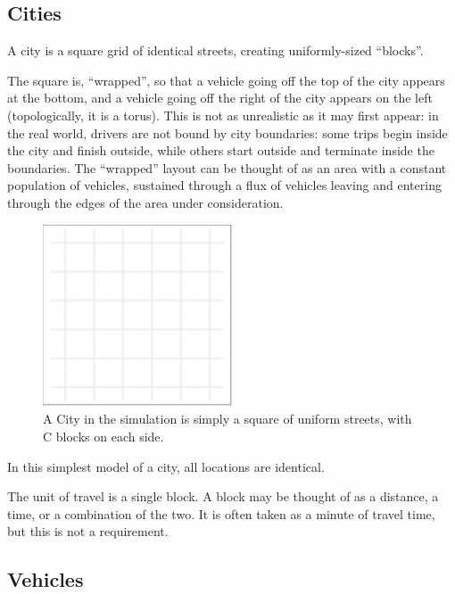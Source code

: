 \documentclass[
  letterpaper,
  DIV=11,
  numbers=noendperiod]{scrartcl}
\begin{document}
\hypertarget{city}{%
\subsection{Cities}\label{city}}

A city is a square grid of identical streets, creating uniformly-sized
``blocks''.

The square is, ``wrapped'', so that a vehicle going off the top of the
city appears at the bottom, and a vehicle going off the right of the
city appears on the left (topologically, it is a torus). This is not as
unrealistic as it may first appear: in the real world, drivers are not
bound by city boundaries: some trips begin inside the city and finish
outside, while others start outside and terminate inside the boundaries.
The ``wrapped'' layout can be thought of as an area with a constant
population of vehicles, sustained through a flux of vehicles leaving and
entering through the edges of the area under consideration.

\begin{figure}

{\centering \includegraphics[width=0.5\textwidth,height=\textheight]{fig1.png}

}

\caption{\label{fig-1}A City in the simulation is simply a square of
uniform streets, with C blocks on each side.}

\end{figure}

In this simplest model of a city, all locations are identical.

The unit of travel is a single block. A block may be thought of as a
distance, a time, or a combination of the two. It is often taken as a
minute of travel time, but this is not a requirement.

\hypertarget{vehicles}{%
\subsection{Vehicles}\label{vehicles}}
\end{document}
